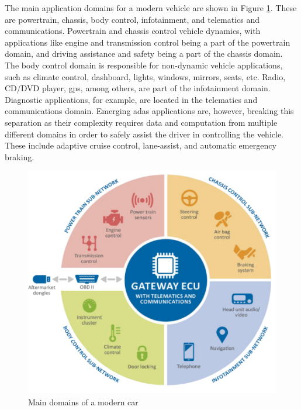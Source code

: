 The main application domains for a modern vehicle are shown in Figure \ref{fig:Car_Domains}. These are powertrain, chassis, body control, infotainment, and telematics and communications. Powertrain and chassis control vehicle dynamics, with applications like engine and transmission control being a part of the powertrain domain, and driving assistance and safety being a part of the chassis domain. The body control domain is responsible for non-dynamic vehicle applications, such as climate control, dashboard, lights, windows, mirrors, seats, etc. Radio, CD/DVD player, \gls{gps}, among others, are part of the infotainment domain. Diagnostic applications, for example, are located in the telematics and communications domain. Emerging \gls{adas} applications are, however, breaking this separation as their complexity requires data and computation from multiple different domains in order to safely assist the driver in controlling the vehicle. These include adaptive cruise control, lane-assist, and automatic emergency braking.

\begin{figure}
    \centering
    \includegraphics[width = .7\textwidth]{img/parts/introduction/Vehicle Architecture.png}
    \caption{Main domains of a modern car \citep{ENISA}}
    \label{fig:Car_Domains}
\end{figure}


